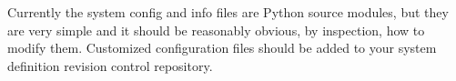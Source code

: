 Currently the system config and info files are Python source modules,
but they are very simple and it should be reasonably obvious, by
inspection, how to modify them. Customized configuration files should
be added to your system definition revision control repository.
